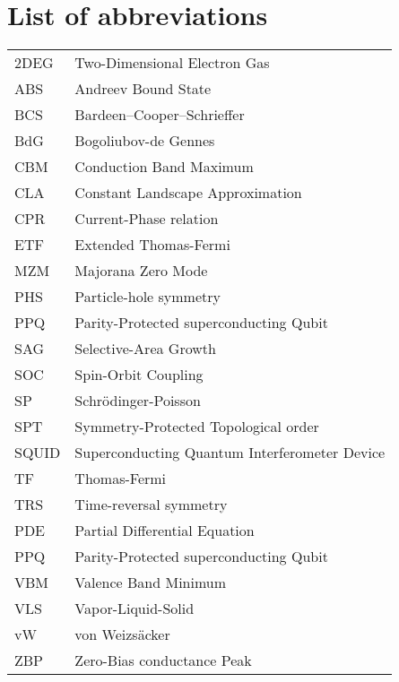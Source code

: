 \documentclass[../main]{subfiles}
\begin{document}
\chapter*{List of abbreviations}

\begin{tabular}{l|l}
    2DEG & Two-Dimensional Electron Gas \\
     ABS & Andreev Bound State \\
     BCS & Bardeen–Cooper–Schrieffer \\
     BdG & Bogoliubov-de Gennes \\
     CBM & Conduction Band Maximum \\ 
     CLA & Constant Landscape Approximation \\
     CPR & Current-Phase relation \\
     ETF & Extended Thomas-Fermi \\
     MZM & Majorana Zero Mode \\
     PHS & Particle-hole symmetry \\
     PPQ & Parity-Protected superconducting Qubit \\
     SAG & Selective-Area Growth \\
     SOC & Spin-Orbit Coupling \\
      SP & Schr\"odinger-Poisson \\
     SPT & Symmetry-Protected Topological order\\
   SQUID & Superconducting Quantum Interferometer Device \\
      TF & Thomas-Fermi \\
     TRS & Time-reversal symmetry \\
     PDE & Partial Differential Equation \\
     PPQ & Parity-Protected superconducting Qubit \\
     VBM & Valence Band Minimum \\ 
     VLS & Vapor-Liquid-Solid \\
      vW & von Weizsäcker \\     
     ZBP & Zero-Bias conductance Peak \\
\end{tabular}
\end{document}
